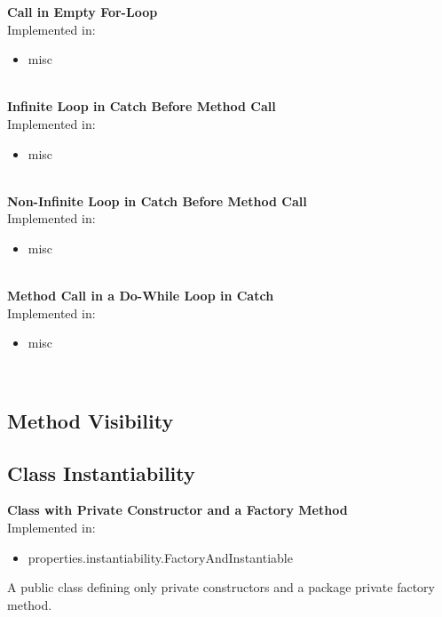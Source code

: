 \documentclass{article}
\begin{document}
\noindent
\textbf{Call in Empty For-Loop}\\
Implemented in: 
\begin{itemize}
    \item misc
\end{itemize}
\\%

\noindent
\textbf{Infinite Loop in Catch Before Method Call}\\
Implemented in: 
\begin{itemize}
    \item misc
\end{itemize}
\\%

\noindent
\textbf{Non-Infinite Loop in Catch Before Method Call}\\
Implemented in: 
\begin{itemize}
    \item misc
\end{itemize}
\\%

\noindent
\textbf{Method Call in a Do-While Loop in Catch}\\
Implemented in: 
\begin{itemize}
    \item misc
\end{itemize}
\\%

\subsection{Method Visibility}
    
\subsection{Class Instantiability}

\textbf{Class with Private Constructor and a Factory Method}\\
Implemented in: 
\begin{itemize}
    \item properties.instantiability.FactoryAndInstantiable
\end{itemize}
A public class defining only private constructors and a package private factory method.\\
\end{document}

